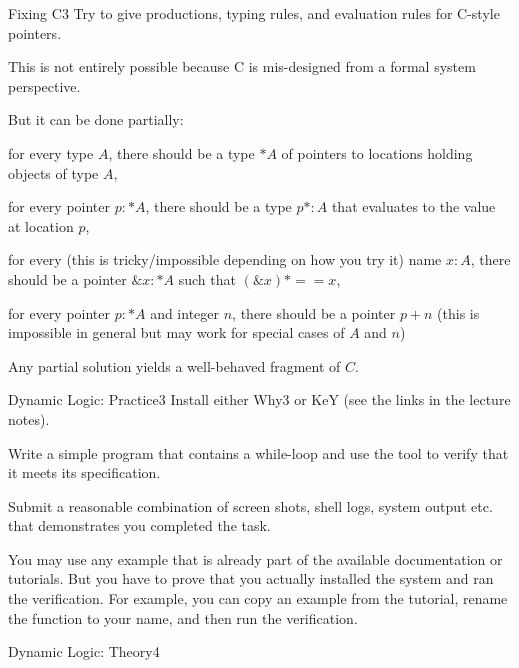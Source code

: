 \documentclass[a4paper]{article}
\begin{document}
\header

\begin{problem}{Fixing C}{3}
Try to give productions, typing rules, and evaluation rules for C-style pointers.

This is not entirely possible because C is mis-designed from a formal system perspective.

But it can be done partially:
\begin{compactitem}
 \item for every type $A$, there should be a type $*A$ of pointers to locations holding objects of type $A$,
 \item for every pointer $p:*A$, there should be a type $p*:A$ that evaluates to the value at location $p$,
 \item for every (this is tricky/impossible depending on how you try it) name $x:A$, there should be a pointer $\&x:*A$ such that $(\&x)*==x$,
 \item for every pointer $p:*A$ and integer $n$, there should be a pointer $p+n$ (this is impossible in general but may work for special cases of $A$ and $n$)
\end{compactitem}

Any partial solution yields a well-behaved fragment of $C$.
\end{problem}

\begin{problem}{Dynamic Logic: Practice}{3}
Install either Why3 or KeY (see the links in the lecture notes).

Write a simple program that contains a while-loop and use the tool to verify that it meets its specification.
\medskip

Submit a reasonable combination of screen shots, shell logs, system output etc. that demonstrates you completed the task.

You may use any example that is already part of the available documentation or tutorials.
But you have to prove that you actually installed the system and ran the verification.
For example, you can copy an example from the tutorial, rename the function to your name, and then run the verification.
\end{problem}


\begin{problem}{Dynamic Logic: Theory}{4}

\end{problem}
\end{document}
